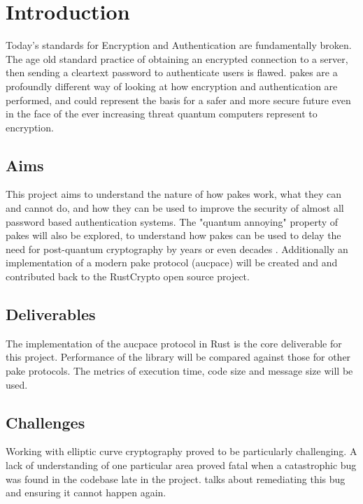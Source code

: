 \chapter{Introduction}
\label{chap:intro}

Today's standards for Encryption and Authentication are fundamentally broken.
The age old standard practice of obtaining an encrypted connection to a server, then sending a cleartext password to authenticate users is flawed.
\glspl{pake} are a profoundly different way of looking at how encryption and authentication are performed, and could represent the basis for a safer and more secure future even in the face of the ever increasing threat quantum computers represent to encryption.

\section{Aims}
This project aims to understand the nature of how \glspl{pake} work, what they can and cannot do, and how they can be used to improve the security of almost all password based authentication systems.
The "quantum annoying" property of \glspl{pake} will also be explored, to understand how \glspl{pake} can be used to delay the need for post-quantum cryptography by years or even decades \cite{quantum-annoying}.
Additionally an implementation of a modern \gls{pake} protocol (\gls{aucpace}) will be created and and contributed back to the RustCrypto open source project.

\section{Deliverables}
The implementation of the \gls{aucpace} protocol in Rust is the core deliverable for this project.
Performance of the library will be compared against those for other \gls{pake} protocols.
The metrics of execution time, code size and message size will be used.

\section{Challenges}
Working with elliptic curve cryptography proved to be particularly challenging.
A lack of understanding of one particular area proved fatal when a catastrophic bug was found in the codebase late in the project.
 talks about remediating this bug and ensuring it cannot happen again.

